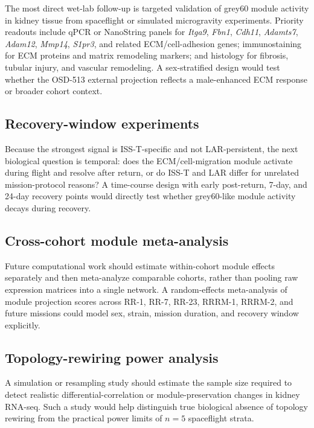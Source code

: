 \documentclass[11pt]{article}
\newcommand{\gene}[1]{\textit{#1}}
\begin{document}
The most direct wet-lab follow-up is targeted validation of grey60 module activity in kidney tissue from spaceflight or simulated microgravity experiments. Priority readouts include qPCR or NanoString panels for \gene{Itga9}, \gene{Fbn1}, \gene{Cdh11}, \gene{Adamts7}, \gene{Adam12}, \gene{Mmp14}, \gene{S1pr3}, and related ECM/cell-adhesion genes; immunostaining for ECM proteins and matrix remodeling markers; and histology for fibrosis, tubular injury, and vascular remodeling. A sex-stratified design would test whether the OSD-513 external projection reflects a male-enhanced ECM response or broader cohort context.

\subsection{Recovery-window experiments}

Because the strongest signal is ISS-T-specific and not LAR-persistent, the next biological question is temporal: does the ECM/cell-migration module activate during flight and resolve after return, or do ISS-T and LAR differ for unrelated mission-protocol reasons? A time-course design with early post-return, 7-day, and 24-day recovery points would directly test whether grey60-like module activity decays during recovery.

\subsection{Cross-cohort module meta-analysis}

Future computational work should estimate within-cohort module effects separately and then meta-analyze comparable cohorts, rather than pooling raw expression matrices into a single network. A random-effects meta-analysis of module projection scores across RR-1, RR-7, RR-23, RRRM-1, RRRM-2, and future missions could model sex, strain, mission duration, and recovery window explicitly.

\subsection{Topology-rewiring power analysis}

A simulation or resampling study should estimate the sample size required to detect realistic differential-correlation or module-preservation changes in kidney RNA-seq. Such a study would help distinguish true biological absence of topology rewiring from the practical power limits of $n=5$ spaceflight strata.
\end{document}
